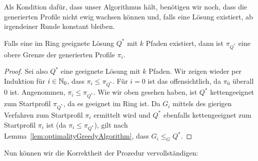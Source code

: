 Als Kondition dafür, dass unser Algorithmus hält, benötigen wir noch, dass die generierten Profile nicht
ewig wachsen können und, falls eine Lösung existiert, ab irgendeiner Runde konstant bleiben.

\begin{lemma}\label{lem:upperBoundProfiles}
    Falls eine im Ring geeignete Lösung $Q^*$ mit $k$ Pfaden existiert, dann ist $\pi_{Q^*}$ eine obere Grenze der
    generierten Profile $\pi_i$.
\end{lemma}
\begin{proof}
    Sei also $Q^*$ eine geeignete Lösung mit $k$ Pfaden.
    Wir zeigen wieder per Induktion für $i \in \mathbb N_0$, dass $\pi_i \leq \pi_{Q^*}$.
    Für $i=0$ ist das offensichtlich, da $\pi_0$ überall 0 ist.
    Angenommen, $\pi_i \leq \pi_{Q^*}$.
    Wie wir oben gesehen haben, ist $Q^*$ kettengeeignet zum Startprofil $\pi_{Q^*}$, da es geeignet im Ring ist.
    Da $G_{i}$ mittels des gierigen Verfahren zum Startprofil $\pi_i$ ermittelt wird und $Q^*$ ebenfalls kettengeeignet
    zum Startprofil $\pi_i$ ist (da $\pi_i \leq \pi_{Q^*}$), gilt nach Lemma~\ref{lem:optimalityGreedyAlgorithm}, dass $G_{i} \leq_G Q^*$.
\end{proof}

Nun können wir die Korrektheit der Prozedur vervollständigen:

